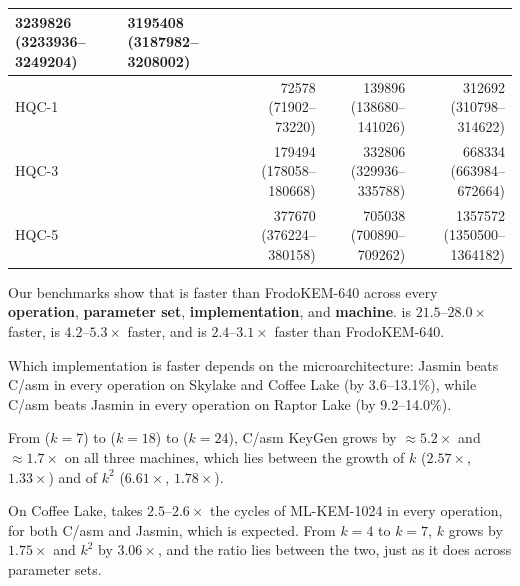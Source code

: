 \begin{table}[h]
\begin{tabular}{llrrr}
\makecell[r]{3239826\\(3233936--3249204)} &
\makecell[r]{3195408\\(3187982--3208002)} \\
\midrule
HQC-1 & \cite{hqc-github} &
\makecell[r]{72578\\(71902--73220)} &
\makecell[r]{139896\\(138680--141026)} &
\makecell[r]{312692\\(310798--314622)} \\
HQC-3 & \cite{hqc-github} &
\makecell[r]{179494\\(178058--180668)} &
\makecell[r]{332806\\(329936--335788)} &
\makecell[r]{668334\\(663984--672664)} \\
HQC-5 & \cite{hqc-github} &
\makecell[r]{377670\\(376224--380158)} &
\makecell[r]{705038\\(700890--709262)} &
\makecell[r]{1357572\\(1350500--1364182)} \\
\bottomrule
\end{tabular}
\end{table}

Our benchmarks show that \kaiburr is faster than FrodoKEM-640 across every
\textbf{operation}, \textbf{parameter set}, \textbf{implementation}, and \textbf{machine}.
  is $21.5$--$28.0\times$ faster,  is $4.2$--$5.3\times$ faster, and  is
$2.4$--$3.1\times$ faster than FrodoKEM-640.

Which \kaiburr implementation is faster depends on the microarchitecture: Jasmin beats C/asm in every
operation on Skylake and Coffee Lake (by 3.6--13.1\%), while C/asm beats Jasmin in every operation on
Raptor Lake (by 9.2--14.0\%).

From  ($k=7$) to  ($k=18$) to  ($k=24$), C/asm KeyGen grows by
${\approx}5.2\times$ and ${\approx}1.7\times$ on all three machines, which lies between the growth of $k$
($2.57\times$, $1.33\times$) and of $k^2$ ($6.61\times$, $1.78\times$).

On Coffee Lake,  takes $2.5$--$2.6\times$ the cycles of ML-KEM-1024 in every operation, for both
C/asm and Jasmin, which is expected. From $k=4$ to $k=7$, $k$ grows by $1.75\times$ and $k^2$ by
$3.06\times$, and the ratio lies between the two, just as it does across \kaiburr parameter sets.

